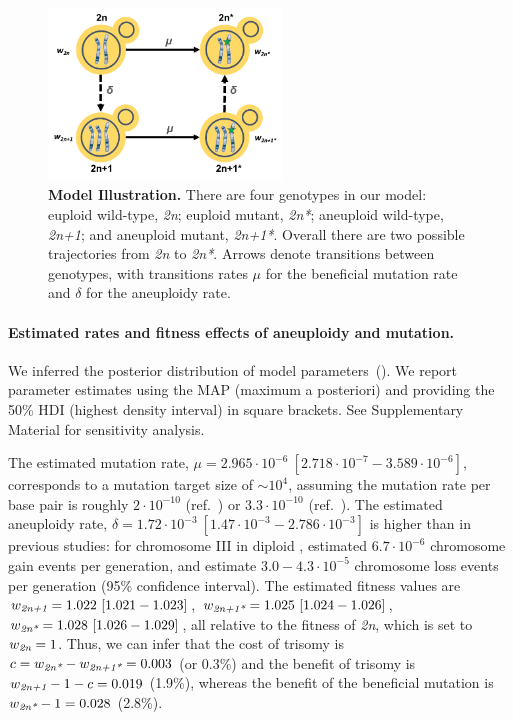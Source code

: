 \documentclass[12pt]{extarticle}
\newcommand{\euwt}{\emph{2n}}
\newcommand{\anwt}{\emph{2n+1}}
\newcommand{\eumt}{\emph{2n*}}
\newcommand{\anmt}{\emph{2n+1*}}
\begin{document}
\begin{figure}[t]
  \centering
    \includegraphics[height=1.8in]{../figures/Fig1-A.pdf}      
  \caption{
    \textbf{Model Illustration.}
    There are four genotypes in our model: euploid wild-type, \euwt; euploid mutant, \eumt; aneuploid wild-type, \anwt; and aneuploid mutant, \anmt.
    Overall there are two possible trajectories from \euwt\; to \eumt.
    Arrows denote transitions between genotypes, with transitions rates $\mu$ for the beneficial mutation rate and $\delta$ for the aneuploidy rate.
   }
  \label{fig:models}
\end{figure}


\paragraph{Estimated rates and fitness effects of aneuploidy and mutation.} 
We inferred the posterior distribution of model parameters~(). 
We report parameter estimates using the MAP (maximum a posteriori) and providing the 50\% HDI (highest density interval) in square brackets. See Supplementary Material for sensitivity analysis.

The estimated mutation rate, $\mu=2.965\cdot10^{-6}\ [2.718\cdot10^{-7}-3.589\cdot10^{-6}]$, corresponds to a mutation target size of $\sim 10^{4}$, assuming the mutation rate per base pair is roughly $2\cdot10^{-10}$ (ref.~\citep{Zhu2014}) or $3.3\cdot10^{-10}$ (ref.~\citep{Lynch2008}).
The estimated aneuploidy rate, $\delta=1.72\cdot10^{-3}\ [1.47\cdot10^{-3}-2.786\cdot10^{-3}]$ is higher than in previous studies: for chromosome III in diploid \yeast, \citet{Zhu2014} estimated $6.7\cdot10^{-6}$ chromosome gain events per generation, and \citet{Kumaran2013} estimate $3.0-4.3\cdot10^{-5}$ chromosome loss events per generation (95\% confidence interval).
The estimated fitness values are $w_{\anwt}=1.022\ [1.021-1.023]$,
$w_{\anmt}=1.025\ [1.024-1.026]$,
$w_{\eumt}=1.028\ [1.026-1.029]$, all relative to the fitness of \euwt, which is set to $w_{\euwt}=1$. 
Thus, we can infer that the cost of trisomy is $c = w_{\eumt}-w_{\anmt} = 0.003$ (or 0.3\%) and the benefit of trisomy is $w_{\anwt}-1-c=0.019$ (1.9\%), whereas the benefit of the beneficial mutation is $w_{\eumt}-1=0.028$ (2.8\%).
\end{document}
